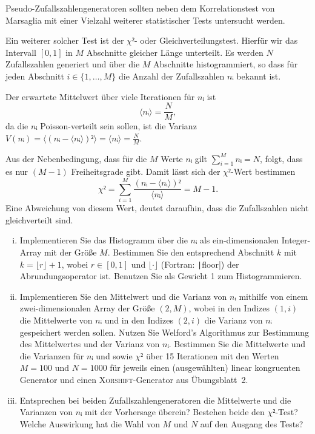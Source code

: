 \begin{question}[subtitle=$χ²$- oder Gleichverteilungstest]
  Pseudo-Zufallszahlengeneratoren sollten neben dem Korrelationstest von Marsaglia mit einer Vielzahl weiterer statistischer Tests untersucht werden.

  Ein weiterer solcher Test ist der $χ²$- oder Gleichverteilungstest.
  Hierfür wir das Intervall $[0, 1]$ in $M$ Abschnitte gleicher Länge unterteilt.
  Es werden $N$ Zufallszahlen generiert und über die $M$ Abschnitte histogrammiert, so dass für jeden Abschnitt $i ∈ \{1, …, M\}$ die Anzahl der Zufallszahlen $nᵢ$ bekannt ist.

  Der erwartete Mittelwert über viele Iterationen für $nᵢ$ ist
  \begin{equation}
    \langle nᵢ \rangle = \frac{N}{M},
  \end{equation}
  da die $nᵢ$ Poisson-verteilt sein sollen, ist die Varianz $V(nᵢ) = \langle (nᵢ - \langle nᵢ \rangle)² \rangle = \langle nᵢ \rangle = \frac{N}{M}$.

  Aus der Nebenbedingung, dass für die $M$ Werte $nᵢ$ gilt $∑_{i = 1}^M nᵢ = N$, folgt, dass es nur $(M - 1)$ Freiheitsgrade gibt.
  Damit lässt sich der $χ²$-Wert bestimmen
  \begin{equation}
    χ² = ∑_{i = 1}^M \frac{(nᵢ - \langle nᵢ \rangle)²}{\langle  nᵢ \rangle} = M - 1.
  \end{equation}
  Eine Abweichung von diesem Wert, deutet daraufhin, dass die Zufallszahlen nicht gleichverteilt sind.

  \begin{enumerate}[(i)]
  \item Implementieren Sie das Histogramm über die $nᵢ$ als ein-dimensionalen Integer-Array mit der Größe $M$.
    Bestimmen Sie den entsprechend Abschnitt $k$ mit $k = \lfloor r \rfloor + 1$, wobei $r ∈ [0, 1]$ und $\lfloor · \rfloor$ (Fortran: \texttt|floor|) der Abrundungsoperator ist.
    Benutzen Sie als Gewicht \num{1} zum Histogrammieren.
  \item Implementieren Sie den Mittelwert und die Varianz von $nᵢ$ mithilfe von einem zwei-dimensionalen Array der Größe $(2, M)$, wobei in den Indizes $(1, i)$ die Mittelwerte von $nᵢ$ und in den Indizes $(2, i)$ die Varianz von $nᵢ$ gespeichert werden sollen. Nutzen Sie Welford's Algorithmus zur Bestimmung des Mittelwertes und der Varianz von $nᵢ$.
    Bestimmen Sie die Mittelwerte und die Varianzen für $nᵢ$ und sowie $χ²$ über \num{15} Iterationen mit den Werten $M = 100$ und $N = 1000$ für jeweils einen (ausgewählten) linear kongruenten Generator und einen \textsc{Xorshift}-Generator aus Übungsblatt~2.
  \item Entsprechen bei beiden Zufallszahlengeneratoren die Mittelwerte und die Varianzen von $nᵢ$ mit der Vorhersage überein? Bestehen beide den $χ²$-Test? Welche Auswirkung hat die Wahl von $M$ und $N$ auf den Ausgang des Tests?
  \end{enumerate}
  \inputminted{fortran}{../src/aufgabe07.f90}
\end{question}
